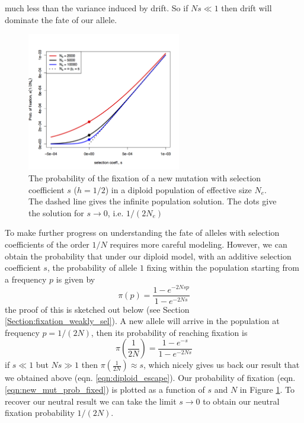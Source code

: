 much less than the variance induced by drift. So if $Ns \ll 1$ then
drift will dominate the fate of our allele. \\
\begin{figure}
\begin{center}
\includegraphics[width=0.6\textwidth]{figures/prob_fix_diffusion.png}
\end{center}
\caption{The probability of the fixation of a new mutation with
  selection coefficient $s$ ($h=1/2$) in a diploid population of effective
  size $N_e$. The dashed line gives the infinite population
  solution. The dots give the solution for $s \rightarrow 0$, i.e. $1/(2N_e)$} \label{fig:prob_fix_diffusion}
\end{figure}

To make further progress on understanding the fate of alleles with
selection coefficients of the order $1/N$ requires more careful
modeling. However, we can obtain the probability that under our diploid model, with an additive selection coefficient $s$, the
probability of allele $1$ fixing within the population starting
from a frequency $p$ is given by
\begin{equation}
\pi(p) = \frac{1-e^{-2Ns p }}{1-e^{-2Ns}} \label{eqn:prob_fixed}
\end{equation}
the proof of this is sketched out below (see Section \ref{Section:fixation_weakly_sel}). A new allele will arrive in the population at frequency $p=1/(2N)$,
then its probability of reaching fixation is
\begin{equation}
\pi \left(\frac{1}{2N} \right) = \frac{1-e^{-s }}{1-e^{-2Ns}} \label{eqn:new_mut_prob_fixed}
\end{equation}
if $s \ll1$ but $Ns \gg 1$ then $\pi(\frac{1}{2N}) \approx s$, which
nicely gives
us back our result that we obtained above
(eqn. \eqref{eqn:diploid_escape}). Our probability of fixation
(eqn. \eqref{eqn:new_mut_prob_fixed}) is plotted as a function of $s$
and $N$ in Figure \ref{fig:prob_fix_diffusion}. To recover our neutral
result we can take the
limit $s \rightarrow 0$ to obtain our neutral fixation
probability $1/(2N)$. \\

